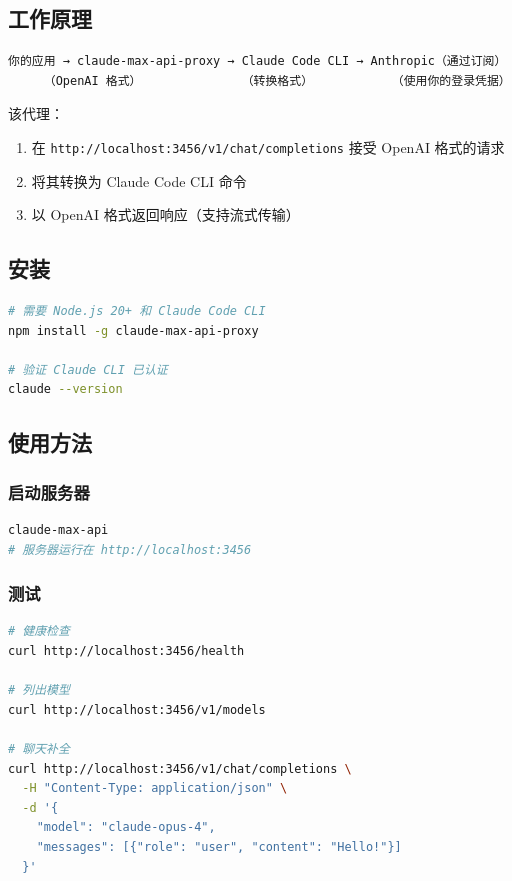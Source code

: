 \subsection{工作原理}


\begin{lstlisting}
你的应用 → claude-max-api-proxy → Claude Code CLI → Anthropic（通过订阅）
     （OpenAI 格式）              （转换格式）           （使用你的登录凭据）
\end{lstlisting}


该代理：

\begin{enumerate}
  \item 在 \texttt{http://localhost:3456/v1/chat/completions} 接受 OpenAI 格式的请求
  \item 将其转换为 Claude Code CLI 命令
  \item 以 OpenAI 格式返回响应（支持流式传输）
\end{enumerate}


\subsection{安装}


\begin{lstlisting}[language=bash]
# 需要 Node.js 20+ 和 Claude Code CLI
npm install -g claude-max-api-proxy

# 验证 Claude CLI 已认证
claude --version
\end{lstlisting}


\subsection{使用方法}


\subsubsection{启动服务器}


\begin{lstlisting}[language=bash]
claude-max-api
# 服务器运行在 http://localhost:3456
\end{lstlisting}


\subsubsection{测试}


\begin{lstlisting}[language=bash]
# 健康检查
curl http://localhost:3456/health

# 列出模型
curl http://localhost:3456/v1/models

# 聊天补全
curl http://localhost:3456/v1/chat/completions \
  -H "Content-Type: application/json" \
  -d '{
    "model": "claude-opus-4",
    "messages": [{"role": "user", "content": "Hello!"}]
  }'
\end{lstlisting}


